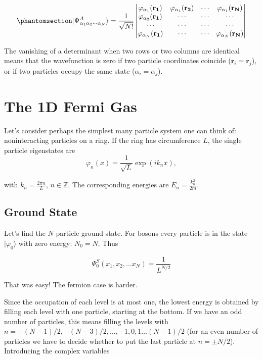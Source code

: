 \documentclass[
  a4paper,
]{scrbook}
\begin{document}
\begin{equation}\phantomsection\label{eq-slater}{
   \lvert{\Psi^{A}_{\alpha_{1}\alpha_{2}\cdots\alpha_{N}}}\rangle=\frac{1}{\sqrt{N!}}\begin{vmatrix}
   \varphi_{\alpha_{1}}(\mathbf{r_{1}}) &   \varphi_{\alpha_{1}}(\mathbf{r_{2}}) & \cdots & \varphi_{\alpha_{1}}(\mathbf{r_{N}}) \\
   \varphi_{\alpha_{2}}(\mathbf{r_{1}}) &  \cdots & \cdots & \cdots  \\
   \cdots & \cdots & \cdots & \cdots  \\
   \varphi_{\alpha_{N}}(\mathbf{r_{1}}) &  \cdots & \cdots & \varphi_{\alpha_{N}}(\mathbf{r_{N}})
 \end{vmatrix}
}\end{equation}

The vanishing of a determinant when two rows or two columns are
identical means that the wavefunction is zero if two particle
coordinates coincide (\(\mathbf{r}_{i}=\mathbf{r}_{j}\)), or if two
particles occupy the same state (\(\alpha_{i}=\alpha_{j}\)).

\chapter{The 1D Fermi Gas}\label{the-1d-fermi-gas}

Let's consider perhaps the simplest many particle system one can think
of: noninteracting particles on a ring. If the ring has circumference
\(L\), the single particle eigenstates are \[
    \label{quantum_statistics_spstates}
    \varphi_{n}(x)=\frac{1}{\sqrt{L}}\exp\left(ik_n x\right),
\]

with \(k_n=\frac{2\pi n}{L}\), \(n\in\mathbb{Z}\). The corresponding
energies are \(E_{n}=\frac{k_n^2}{2m}\).

\section{Ground State}\label{ground-state}

Let's find the \(N\) particle ground state. For bosons every particle is
in the state \(\lvert{\varphi_{0}}\rangle\) with zero energy:
\(N_{0}=N\). Thus

\[
    \Psi^{S}_0(x_{1},x_{2},\ldots x_{N})=\frac{1}{L^{N/2}}
\]

That was easy! The fermion case is harder.

Since the occupation of each level is at most one, the lowest energy is
obtained by filling each level with one particle, starting at the
bottom. If we have an odd number of particles, this means filling the
levels with \(n=-(N-1)/2, -(N-3)/2,\ldots, -1, 0, 1 \ldots (N-1)/2\)
(for an even number of particles we have to decide whether to put the
last particle at \(n=\pm N/2\)). Introducing the complex variables
\end{document}
